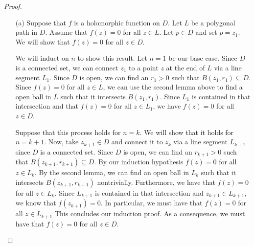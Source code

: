 \documentclass[a4paper]{article}
\begin{document}
\begin{proof}
\begin{enumerate}
    \item[(a)] Suppose that \( f  \) is a holomorphic function on \( D  \). Let \( L  \) be a polygonal path in \( D  \). Assume that \( f(z) = 0  \) for all \( z \in L  \). Let \( p  \in D  \) and set \( p = {z}_{1} \). We will show that \( f(z) = 0  \) for all \( z \in D  \). 

        We will induct on \( n  \) to show this result. Let \( n = 1  \) be our base case. Since \( D  \) is a connected set, we can connect \( {z}_{1} \) to a point \( z  \) at the end of \( L  \) via a line segment \( {L}_{1} \). Since \( D  \) is open, we can find an \( {r}_{1} > 0  \) such that \( B({z}_{1}, {r}_{1}) \subseteq  D  \). Since \( f(z) = 0  \) for all \( z \in L  \), we can use the second lemma above to find a open ball in \( L  \) such that it intersects \( B({z}_{1} , {r}_{1}) \). Since \( {L}_{1}  \) is contained in that intersection and that \( f(z) = 0  \) for all \( z \in {L}_{1}  \), we have \( f(z) = 0  \) for all \( z \in D  \).

        Suppose that this process holds for \( n = k  \). We will show that it holds for \( n = k + 1  \). Now, take \( {z}_{k+1} \in D  \) and connect it to \( {z}_{k} \) via a line segment \( {L}_{k+1} \) since \( D  \) is a connected set. Since \( D  \) is open, we can find an \( {r}_{k+1} > 0  \) such that \( B({z}_{k+1}, {r}_{k+1}) \subseteq  D  \). By our induction hypothesis \( f(z) = 0  \) for all \( z \in {L}_{k} \). By the second lemma, we can find an open ball in \( {L}_{k} \) such that it intersects \( B({z}_{k+1}, {r}_{k+1}) \) nontrivially. Furthermore, we have that \( f(z)= 0  \) for all \(  z \in {L}_{k} \). Since \( {L}_{k+1} \) is contained in that intersection and \( {z}_{k+1} \in {L}_{k+1} \), we know that \( f(z_{k+1}) = 0  \). In particular, we must have that \( f(z) = 0  \) for all \( z \in {L}_{k+1} \) This concludes our induction proof. As a consequence, we must have that \( f(z)  = 0  \) for all \( z \in D  \). 


\end{enumerate}
\end{proof}
\end{document}
